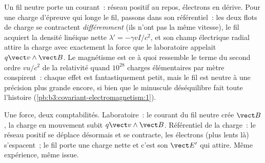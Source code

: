 \begin{example}\label{ex:b3:covariant-electromagnetism:wire}
Un fil neutre porte un courant~: réseau positif au repos, électrons en
dérive. Pour une charge d'épreuve qui longe le fil, passons dans son
référentiel~: les deux flots de charge se contractent
\emph{différemment} (ils n'ont pas la même vitesse), le fil acquiert la
densité linéique nette $\lambda' =
-\gamma vI/c^2$, et son champ électrique radial attire la charge avec
exactement la force que le laboratoire appelait $q\vect v\wedge\vect B$.
Le magnétisme est ce à quoi ressemble le terme du second ordre $v u/c^2$
de la relativité quand $10^{28}$ charges élémentaires par mètre
conspirent~: chaque effet est fantastiquement petit, mais le fil est
neutre à une précision plus grande encore, si bien que le minuscule
déséquilibre fait toute l'histoire
(\cref{pb:b3:covariant-electromagnetism:1}).
\end{example}

\begin{omfigure}

{\small Une force, deux comptabilités. Laboratoire~: le courant du fil
neutre crée $\vect B$, la charge en mouvement subit
$q\vect v\wedge\vect B$. Référentiel de la charge~: le réseau positif
se déplace désormais et se contracte, les électrons (plus lents là)
s'espacent~; le fil porte une charge nette et c'est son $\vect E'$ qui
attire. Même expérience, même issue.}
\end{omfigure}

